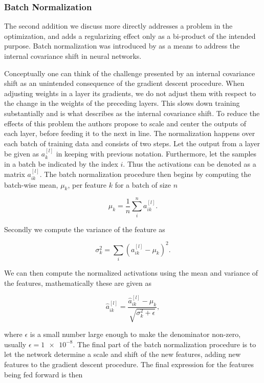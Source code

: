 \subsubsection{Batch Normalization}\label{sec:batchnorm}

The second addition we discuss more directly addresses a problem in the optimization, and adds a regularizing effect only as a bi-product of the intended purpose. Batch normalization was introduced by \citet{Ioffe2015} as a means to address the internal covariance shift in neural networks. 

Conceptually one can think of the challenge presented by an internal covariance shift as an unintended consequence of the gradient descent procedure. When adjusting weights in a layer its gradients, we do not adjust them with respect to the change in the weights of the preceding layers. This slows down training substantially and is what \citet{Ioffe2015} describes as the internal covariance shift. To reduce the effects of this problem the authors propose to scale and center the outputs of each layer, before feeding it to the next in line. The normalization happens over each batch of training data and consists of two steps. Let the output from a layer be given as $a_k^{[l]}$ in keeping with previous notation. Furthermore, let the samples in a batch be indicated by the index $i$. Thus the activations can be denoted as a matrix $a_{ik}^{[l]}$. The batch normalization procedure then begins by computing the batch-wise mean, $\mu_k$, per feature $k$ for a batch of size $n$ 

\begin{equation}
\mu_k = \frac{1}{n} \sum_i^n a_{ik}^{[l]}.
\end{equation}

\noindent Secondly we compute the variance of the feature as 

\begin{equation}
\sigma_k^2= \sum_i (a^{[l]}_{ik} - \mu_k)^2.
\end{equation}

\noindent We can then compute the normalized activations using the mean and variance of the features, mathematically these are given as

\begin{equation}
\hat{a}_{ik}^{[l]} = \frac{\hat{a}_{ik}^{[l]} - \mu_k}{\sqrt{\sigma_k^2 + \epsilon}},
\end{equation}

\noindent where $\epsilon$ is a small number large enough to make the denominator non-zero, usually $\epsilon = \num{1e-8}$. The final part of the batch normalization procedure is to let the network determine a scale and shift of the new features, adding new features to the gradient descent procedure. The final expression for the features being fed forward is then 

